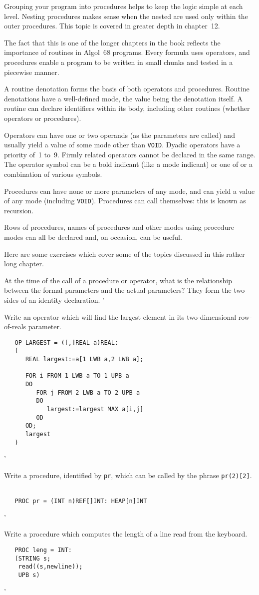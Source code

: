 Grouping your program into procedures helps to keep the logic simple
at each level.  Nesting procedures makes sense when the nested
 are used only within the outer
procedures.  This topic is covered in greater depth in chapter~12.

The fact that this is one of the longer chapters in the book reflects
the importance of routines in Algol~68 programs. Every formula uses
operators, and procedures enable a program to be written in small
chunks and tested in a piecewise manner.

A routine denotation forms the basis of both operators and
procedures.  Routine denotations have a well-defined mode, the value
being the denotation itself. A routine can declare identifiers within
its body, including other routines (whether operators or procedures).

Operators can have one or two operands (as the parameters are called)
and usually yield a value of some mode other than \verb|VOID|. Dyadic
operators have a priority of~1 to~9. Firmly related operators cannot be
declared in the same range. The operator symbol can be a bold indicant
(like a mode indicant) or one of or a combination of various symbols.

Procedures can have none or more parameters of any mode, and can
yield a value of any mode (including \verb|VOID|). Procedures can
call themselves: this is known as recursion.

Rows of procedures, names of procedures and other modes using
procedure modes can all be declared and, on occasion, can be useful.

Here are some exercises which cover some of the topics discussed in
this rather long chapter.

\begin{exercise}
\item At the time of the call of a procedure or operator, what is the
relationship between the formal parameters and the actual parameters?
\ans They form the two sides of an identity declaration.
'
\item Write an operator which will find the largest element in its
two-dimensional row-of-reals parameter. \ans \ %
\begin{verbatim}
   OP LARGEST = ([,]REAL a)REAL:
   (
      REAL largest:=a[1 LWB a,2 LWB a];

      FOR i FROM 1 LWB a TO 1 UPB a
      DO
         FOR j FROM 2 LWB a TO 2 UPB a
         DO
            largest:=largest MAX a[i,j]
         OD
      OD;
      largest
   )
\end{verbatim}
'
\item Write a procedure, identified by \verb|pr|, which can be called by the
phrase \verb|pr(2)[2]|. \ans \ %
\begin{verbatim}
   PROC pr = (INT n)REF[]INT: HEAP[n]INT
\end{verbatim}
'
\item Write a procedure which computes the length of a line read from the
keyboard. \ans \ %
\begin{verbatim}
   PROC leng = INT:
   (STRING s;
    read((s,newline));
    UPB s)
\end{verbatim}
'
\end{exercise}
